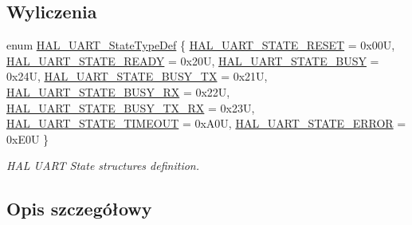 \subsection*{Wyliczenia}
\begin{DoxyCompactItemize}
\item 
enum \hyperlink{group___u_a_r_t___exported___types_gaf55d844a35379c204c90be5d1e8e50ba}{H\+A\+L\+\_\+\+U\+A\+R\+T\+\_\+\+State\+Type\+Def} \{ \newline
\hyperlink{group___u_a_r_t___exported___types_ggaf55d844a35379c204c90be5d1e8e50baa9c7d889fce61ccc717228d099a61d113}{H\+A\+L\+\_\+\+U\+A\+R\+T\+\_\+\+S\+T\+A\+T\+E\+\_\+\+R\+E\+S\+ET} = 0x00U, 
\hyperlink{group___u_a_r_t___exported___types_ggaf55d844a35379c204c90be5d1e8e50baade763629c1bdb4f08e52ef79d6e0900e}{H\+A\+L\+\_\+\+U\+A\+R\+T\+\_\+\+S\+T\+A\+T\+E\+\_\+\+R\+E\+A\+DY} = 0x20U, 
\hyperlink{group___u_a_r_t___exported___types_ggaf55d844a35379c204c90be5d1e8e50baad1eddce038ba828e8b4061a33a2d8801}{H\+A\+L\+\_\+\+U\+A\+R\+T\+\_\+\+S\+T\+A\+T\+E\+\_\+\+B\+U\+SY} = 0x24U, 
\hyperlink{group___u_a_r_t___exported___types_ggaf55d844a35379c204c90be5d1e8e50baadc97ca42e9b05a08cb98e6721e27e80c}{H\+A\+L\+\_\+\+U\+A\+R\+T\+\_\+\+S\+T\+A\+T\+E\+\_\+\+B\+U\+S\+Y\+\_\+\+TX} = 0x21U, 
\newline
\hyperlink{group___u_a_r_t___exported___types_ggaf55d844a35379c204c90be5d1e8e50baaf7929f7aebd6b450c25907904411680b}{H\+A\+L\+\_\+\+U\+A\+R\+T\+\_\+\+S\+T\+A\+T\+E\+\_\+\+B\+U\+S\+Y\+\_\+\+RX} = 0x22U, 
\hyperlink{group___u_a_r_t___exported___types_ggaf55d844a35379c204c90be5d1e8e50baa2fdde93f9f55972b7133bf7c75dd2e8a}{H\+A\+L\+\_\+\+U\+A\+R\+T\+\_\+\+S\+T\+A\+T\+E\+\_\+\+B\+U\+S\+Y\+\_\+\+T\+X\+\_\+\+RX} = 0x23U, 
\hyperlink{group___u_a_r_t___exported___types_ggaf55d844a35379c204c90be5d1e8e50baa90891eeb767df19780e620a15bec807d}{H\+A\+L\+\_\+\+U\+A\+R\+T\+\_\+\+S\+T\+A\+T\+E\+\_\+\+T\+I\+M\+E\+O\+UT} = 0x\+A0U, 
\hyperlink{group___u_a_r_t___exported___types_ggaf55d844a35379c204c90be5d1e8e50baa5d50bfe0750db02c4fd03d778c8c318c}{H\+A\+L\+\_\+\+U\+A\+R\+T\+\_\+\+S\+T\+A\+T\+E\+\_\+\+E\+R\+R\+OR} = 0x\+E0U
 \}\begin{DoxyCompactList}\small\item\em H\+AL U\+A\+RT State structures definition. \end{DoxyCompactList}
\end{DoxyCompactItemize}


\subsection{Opis szczegółowy}


